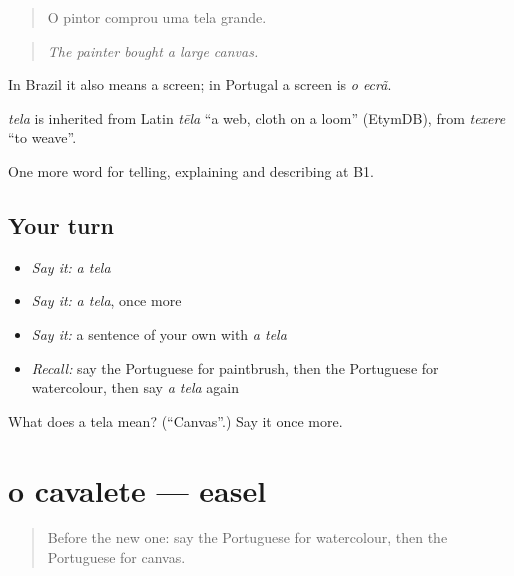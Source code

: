 \begin{quote}
O pintor comprou uma tela grande.
\end{quote}

\begin{quote}
\emph{The painter bought a large canvas.}
\end{quote}

In Brazil it also means a screen; in Portugal a screen is \emph{o ecrã}.

\begin{cousinweb}
\emph{tela} is inherited from Latin \emph{tēla} \textquotedblleft{}a web, cloth on a loom\textquotedblright{} (EtymDB), from \emph{texere} \textquotedblleft{}to weave\textquotedblright{}.
\end{cousinweb}

\begin{grammarlens}[title={What you've built}]
One more word for telling, explaining and describing at B1.
\end{grammarlens}

\subsection*{Your turn}
\begin{itemize}
\raggedright
  \item \emph{Say it:} \emph{a tela}
  \item \emph{Say it:} \emph{a tela}, once more
  \item \emph{Say it:} a sentence of your own with \emph{a tela}
  \item \emph{Recall:} say the Portuguese for paintbrush, then the Portuguese for watercolour, then say \emph{a tela} again
\end{itemize}

\begin{tcolorbox}[breakable,colback=teal!4,colframe=teal!35!black,title={Before you move on}]
What does a tela mean? (\textquotedblleft{}Canvas\textquotedblright{}.) Say it once more.
\end{tcolorbox}
\section[o cavalete]{o cavalete — easel}

\label{lesson:PT-C505-cavalete}



\begin{quote}
Before the new one: say the Portuguese for watercolour, then the Portuguese for canvas.
\end{quote}

